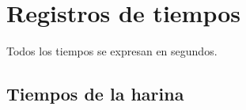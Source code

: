 
\chapter{Registros de tiempos}
\label{ap:tablas_dosificacion}

\normalsize

Todos los tiempos se expresan en segundos.

\section{Tiempos de la harina}

